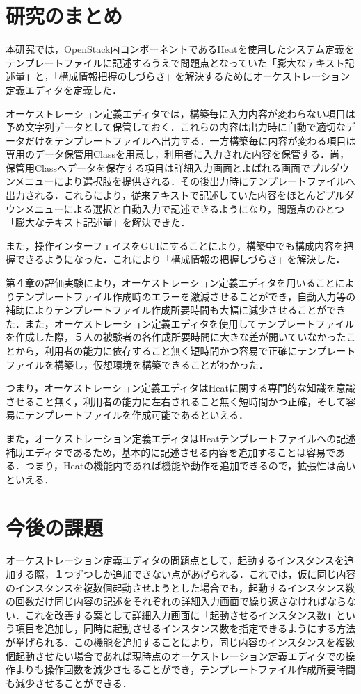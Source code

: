 \documentclass[mingoth]{kut-paper}		%
\begin{document}
	\section{研究のまとめ}
	本研究では，OpenStack内コンポーネントであるHeatを使用したシステム定義をテンプレートファイルに記述するうえで問題点となっていた「膨大なテキスト記述量」と，「構成情報把握のしづらさ」を解決するためにオーケストレーション定義エディタを定義した．
	
	オーケストレーション定義エディタでは，構築毎に入力内容が変わらない項目は予め文字列データとして保管しておく．これらの内容は出力時に自動で適切なデータだけをテンプレートファイルへ出力する．一方構築毎に内容が変わる項目は専用のデータ保管用Classを用意し，利用者に入力された内容を保管する．尚，保管用Classへデータを保存する項目は詳細入力画面とよばれる画面でプルダウンメニューにより選択肢を提供される．その後出力時にテンプレートファイルへ出力される．これらにより，従来テキストで記述していた内容をほとんどプルダウンメニューによる選択と自動入力で記述できるようになり，問題点のひとつ「膨大なテキスト記述量」を解決できた．
	
	また，操作インターフェイスをGUIにすることにより，構築中でも構成内容を把握できるようになった．これにより「構成情報の把握しづらさ」を解決した．
	
	第４章の評価実験により，オーケストレーション定義エディタを用いることによりテンプレートファイル作成時のエラーを激減させることができ，自動入力等の補助によりテンプレートファイル作成所要時間も大幅に減少させることができた．また，オーケストレーション定義エディタを使用してテンプレートファイルを作成した際，５人の被験者の各作成所要時間に大きな差が開いていなかったことから，利用者の能力に依存すること無く短時間かつ容易で正確にテンプレートファイルを構築し，仮想環境を構築できることがわかった．
	
	つまり，オーケストレーション定義エディタはHeatに関する専門的な知識を意識させること無く，利用者の能力に左右されること無く短時間かつ正確，そして容易にテンプレートファイルを作成可能であるといえる．
	
	また，オーケストレーション定義エディタはHeatテンプレートファイルへの記述補助エディタであるため，基本的に記述させる内容を追加することは容易である．つまり，Heatの機能内であれば機能や動作を追加できるので，拡張性は高いといえる．
	\section{今後の課題}
	オーケストレーション定義エディタの問題点として，起動するインスタンスを追加する際，１つずつしか追加できない点があげられる．これでは，仮に同じ内容のインスタンスを複数個起動させようとした場合でも，起動するインスタンス数の回数だけ同じ内容の記述をそれぞれの詳細入力画面で繰り返さなければならない．これを改善する案として詳細入力画面に「起動させるインスタンス数」という項目を追加し，同時に起動させるインスタンス数を指定できるようにする方法が挙げられる．この機能を追加することにより，同じ内容のインスタンスを複数個起動させたい場合であれば現時点のオーケストレーション定義エディタでの操作よりも操作回数を減少させることができ，テンプレートファイル作成所要時間も減少させることができる．
	
\end{document}
